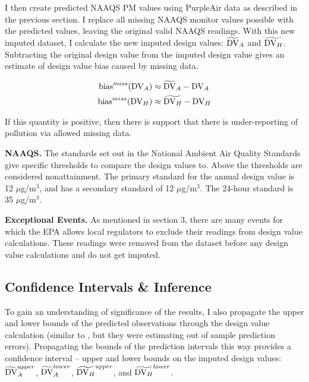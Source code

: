 \documentclass[12pt]{article}
\begin{document}
I then create predicted NAAQS PM values using PurpleAir data as described in the previous section. I replace all missing NAAQS monitor values possible with the predicted values, leaving the original valid NAAQS readings. With this new imputed dataset, I calculate the new imputed design values: $\widetilde{\text{DV}}_A$ and $\widetilde{\text{DV}_H}$. Subtracting the original design value from the imputed design value gives an estimate of design value bias caused by missing data.

\begin{align}
    \text{bias}^{miss}(\text{DV}_A) &\approx \widetilde{\text{DV}}_A - \text{DV}_A\\
    \text{bias}^{miss}(\text{DV}_H) &\approx \widetilde{\text{DV}_H} - \text{DV}_H
\end{align}

If this quantity is positive, then there is support that there is under-reporting of pollution via allowed missing data. 

\textbf{NAAQS.} The standards set out in the National Ambient Air Quality Standards give specific thresholds to compare the design values to. Above the thresholds are considered nonattainment. The primary standard for the annual design value is 12 $\mu$g/m$^3$, and has a secondary standard of 12 $\mu$g/m$^3$. The 24-hour standard is 35 $\mu$g/m$^3$.


\textbf{Exceptional Events.} As mentioned in section 3, there are many events for which the EPA allows local regulators to exclude their readings from design value calculations. These readings were removed from the dataset before any design value calculations and do not get imputed.



\subsection{Confidence Intervals \& Inference} \label{confidence_intervals}
To gain an understanding of significance of the results, I also propagate the upper and lower bounds of the predicted observations through the design value calculation (similar to \cite{fowlieBringingSatelliteBasedAir2019}, but they were estimating out of sample prediction errors). Propagating the bounds of the prediction intervals this way provides a confidence interval -- upper and lower bounds on the imputed design values: $\widetilde{\text{DV}}_A^{upper}$,  $\widetilde{\text{DV}}_A^{lower}$, $\widetilde{\text{DV}_H}^{upper}$, and $\widetilde{\text{DV}_H}^{lower}$.
\end{document}
